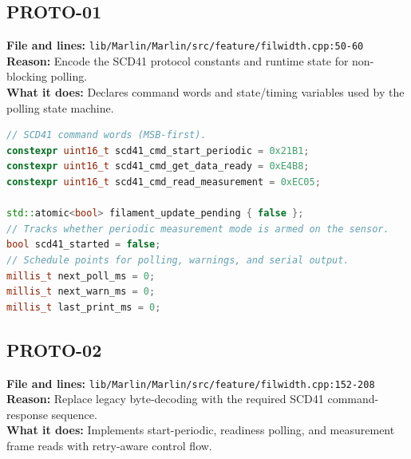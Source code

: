 \subsection*{PROTO-01}
\textbf{File and lines:} \texttt{lib/Marlin/Marlin/src/feature/filwidth.cpp:50-60} \\
\textbf{Reason:} Encode the SCD41 protocol constants and runtime state for non-blocking polling. \\
\textbf{What it does:} Declares command words and state/timing variables used by the polling state machine.

\begin{lstlisting}[language=C++,caption={PROTO-01: SCD41 command set and state variables},label={lst:proto-01}]
// SCD41 command words (MSB-first).
constexpr uint16_t scd41_cmd_start_periodic = 0x21B1;
constexpr uint16_t scd41_cmd_get_data_ready = 0xE4B8;
constexpr uint16_t scd41_cmd_read_measurement = 0xEC05;

std::atomic<bool> filament_update_pending { false };
// Tracks whether periodic measurement mode is armed on the sensor.
bool scd41_started = false;
// Schedule points for polling, warnings, and serial output.
millis_t next_poll_ms = 0;
millis_t next_warn_ms = 0;
millis_t last_print_ms = 0;
\end{lstlisting}

\subsection*{PROTO-02}
\textbf{File and lines:} \texttt{lib/Marlin/Marlin/src/feature/filwidth.cpp:152-208} \\
\textbf{Reason:} Replace legacy byte-decoding with the required SCD41 command-response sequence. \\
\textbf{What it does:} Implements start-periodic, readiness polling, and measurement frame reads with retry-aware control flow.

